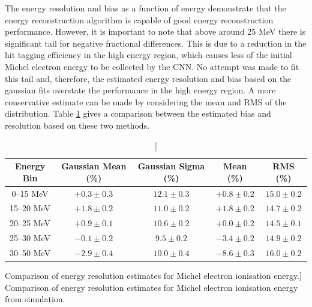 The energy resolution and bias as a function of energy demonstrate that the
energy reconstruction algorithm is capable of good energy reconstruction
performance. However, it is important to note that above around 25 MeV there is
significant tail for negative fractional differences. This is due to a reduction
in the hit tagging efficiency in the high energy region, which causes less of
the initial Michel electron energy to be collected by the CNN. No attempt was
made to fit this tail and, therefore, the estimated energy resolution and bias
based on the gaussian fits overstate the performance in the high energy region.
A more conservative estimate can be made by considering the mean and RMS of the
distribution. Table \ref{tab:gaus_v_mean} gives a comparison between the
estimated bias and resolution based on these two methods.
\begin{table}
	\centering
	\bgroup
	\def\arraystretch{1.5}
	\begin{tabular}{c|c|c|c|c}
		Energy Bin & Gaussian Mean (\%) & Gaussian Sigma (\%) & Mean  (\%)     & RMS (\%)   \\ \hline
		0--15 MeV  & $+0.3 \pm 0.3$     & $12.1 \pm 0.3$      & $+0.8 \pm 0.2$ & $15.0 \pm 0.2$  \\
		15--20 MeV & $+1.8 \pm 0.2$     & $11.0 \pm 0.2$      & $+1.8 \pm 0.2$ & $14.7 \pm 0.2$ \\
		20--25 MeV & $+0.9 \pm 0.1$     & $10.6 \pm 0.2$      & $+0.0 \pm 0.2$ & $14.5 \pm 0.1$ \\
		25--30 MeV & $-0.1 \pm 0.2$     & $9.5 \pm 0.2$       & $-3.4 \pm 0.2$ & $14.9 \pm 0.2$ \\
		30--50 MeV & $-2.9 \pm 0.4$     & $10.0 \pm 0.4$      & $-8.6 \pm 0.3$ & $16.0 \pm 0.2$\\


	\end{tabular}
	\egroup
	\caption
	[Comparison of energy resolution estimates for Michel electron ionisation
	energy.]
	{ Comparison of energy resolution estimates for Michel electron ionisation
	energy from \protodune{} simulation. }
	\label{tab:gaus_v_mean}
\end{table}

